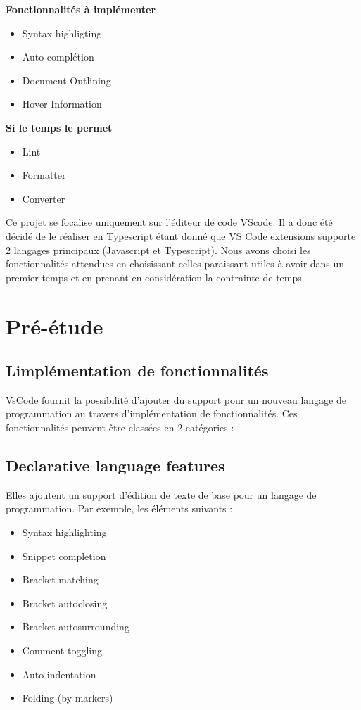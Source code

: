 \documentclass[
    iict, %
    il, %
]{heig-tb}
\begin{document}
\textbf{Fonctionnalités à implémenter}
\begin{itemize}
    \item Syntax highligting
    \item Auto-complétion
    \item Document Outlining
    \item Hover Information
\end{itemize}

\textbf{Si le temps le permet}
\begin{itemize}
    \item Lint
    \item Formatter
    \item Converter
\end{itemize}

Ce projet se focalise uniquement sur l’éditeur de code VScode.
Il a donc été décidé de le réaliser en Typescript étant donné que VS Code extensions supporte 2 langages principaux (Javascript et Typescript).
Nous avons choisi les fonctionnalités attendues en choisissant celles paraissant utiles à avoir dans un premier temps et en prenant en considération la contrainte de temps.


\chapter{Pré-étude}

\section{L\textquotesingle implémentation de fonctionnalités}
VsCode fournit la possibilité d’ajouter du support pour un nouveau langage de programmation au travers d’implémentation de fonctionnalités. Ces fonctionnalités peuvent être classées en 2 catégories :

\section{Declarative language features}
Elles ajoutent un support d'édition de texte de base pour un langage de programmation.
Par exemple, les éléments suivants :

\begin{itemize}
    \item Syntax highlighting
    \item Snippet completion
    \item Bracket matching
    \item Bracket autoclosing
    \item Bracket autosurrounding
    \item Comment toggling
    \item Auto indentation
    \item Folding (by markers)
\end{itemize}
\end{document}
